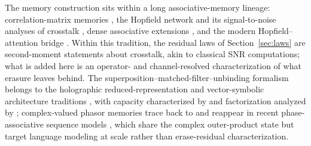 \documentclass[11pt,a4paper]{article}
\begin{document}
The memory construction sits within a long associative-memory lineage: correlation-matrix memories \citep{kohonen1972correlation,willshaw1969nonholographic}, the Hopfield network and its signal-to-noise analyses of crosstalk \citep{hopfield1982neural}, dense associative extensions \citep{krotov2016dense}, and the modern Hopfield--attention bridge \citep{ramsauer2021hopfield}. Within this tradition, the residual laws of Section~\ref{sec:laws} are second-moment statements about crosstalk, akin to classical SNR computations; what is added here is an operator- and channel-resolved characterization of what erasure leaves behind. The superposition--matched-filter--unbinding formalism belongs to the holographic reduced-representation and vector-symbolic architecture traditions \citep{plate1995holographic,kanerva2009hyperdimensional,gayler2003vector}, with capacity characterized by \citet{frady2018theory} and factorization analyzed by \citet{frady2020resonator}; complex-valued phasor memories trace back to \citet{noest1988phasor} and reappear in recent phase-associative sequence models \citep{vishwakarma2026phaseassociative}, which share the complex outer-product state but target language modeling at scale rather than erase-residual characterization.
\end{document}
